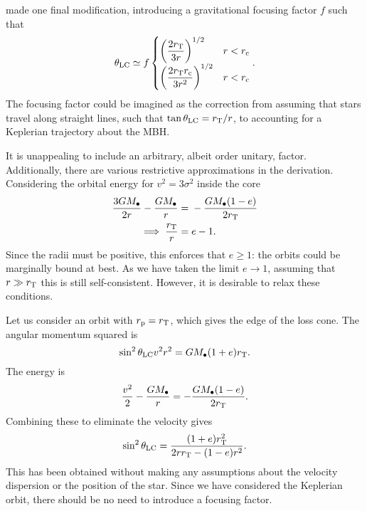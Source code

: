 \citet{Frank1976} made one final modification, introducing a gravitational focusing factor $f$ such that
\begin{align}
\theta_\mathrm{LC} \simeq f\begin{cases}\displaystyle
\displaystyle \left(\frac{2r_\mathrm{T}}{3r}\right)^{1/2} & r < r_\mathrm{c} \\
\displaystyle \left(\frac{2r_\mathrm{T}r_\mathrm{c}}{3r^2}\right)^{1/2} & r < r_\mathrm{c}
\end{cases}.
\end{align}
The focusing factor could be imagined as the correction from assuming that stars travel along straight lines, such that $\tan\theta_\mathrm{LC} = r_\mathrm{T}/r$, to accounting for a Keplerian trajectory about the MBH.

It is unappealing to include an arbitrary, albeit order unitary, factor. Additionally, there are various restrictive approximations in the derivation. Considering the orbital energy for $v^2 = 3\sigma^2$ inside the core
\begin{align}
\frac{3GM_\bullet}{2r} - \frac{GM_\bullet}{r} = {} & -\frac{GM_\bullet(1-e)}{2r_\mathrm{T}} \\
\implies \frac{r_\mathrm{T}}{r} = {} & e - 1.
\end{align}
Since the radii must be positive, this enforces that $e \geq 1$: the orbits could be marginally bound at best. As we have taken the limit $e \rightarrow 1$, assuming that $r \gg r_\mathrm{T}$ this is still self-consistent. However, it is desirable to relax these conditions.

Let us consider an orbit with $r_\mathrm{p} = r_\mathrm{T}$, which gives the edge of the loss cone. The angular momentum squared is
\begin{equation}
\sin^2\theta_\mathrm{LC}v^2r^2 = GM_\bullet(1+e)r_\mathrm{T}.
\end{equation}
The energy is
\begin{equation}
\frac{v^2}{2} - \frac{GM_\bullet}{r} = -\frac{GM_\bullet(1-e)}{2r_\mathrm{T}}.
\end{equation}
Combining these to eliminate the velocity gives
\begin{equation}
\sin^2\theta_\mathrm{LC} = \frac{(1+e)r_\mathrm{T}^2}{2rr_\mathrm{T} - (1-e)r^2}.
\end{equation}
This has been obtained without making any assumptions about the velocity dispersion or the position of the star. Since we have considered the Keplerian orbit, there should be no need to introduce a focusing factor.

